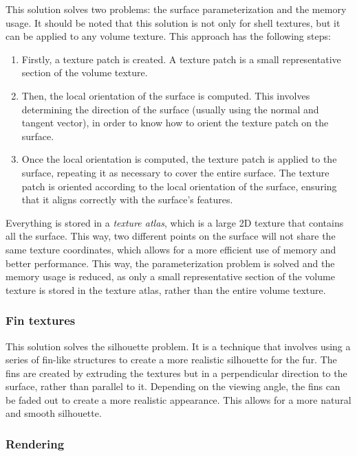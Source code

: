 This solution solves two problems: the surface parameterization and the memory usage. It should be noted that this solution is not only for shell textures, but it can be applied to any volume texture. This approach has the following steps:
\begin{enumerate}
    \item Firstly, a texture patch is created. A texture patch is a small representative section of the volume texture.
    \item Then, the local orientation of the surface is computed. This involves determining the direction of the surface (usually using the normal and tangent vector), in order to know how to orient the texture patch on the surface.
    \item Once the local orientation is computed, the texture patch is applied to the surface, repeating it as necessary to cover the entire surface. The texture patch is oriented according to the local orientation of the surface, ensuring that it aligns correctly with the surface's features.
\end{enumerate}

Everything is stored in a \emph{texture atlas}, which is a large 2D texture that contains all the surface. This way, two different points on the surface will not share the same texture coordinates, which allows for a more efficient use of memory and better performance. This way, the parameterization problem is solved and the memory usage is reduced, as only a small representative section of the volume texture is stored in the texture atlas, rather than the entire volume texture.

\subsubsection{Fin textures}

This solution solves the silhouette problem. It is a technique that involves using a series of fin-like structures to create a more realistic silhouette for the fur. The fins are created by extruding the textures but in a perpendicular direction to the surface, rather than parallel to it. Depending on the viewing angle, the fins can be faded out to create a more realistic appearance. This allows for a more natural and smooth silhouette.

\subsubsection{Rendering}

